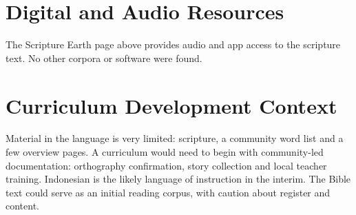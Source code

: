 \documentclass[12pt]{article}
\begin{document}
\section{Digital and Audio Resources}
The Scripture Earth page above provides audio and app access to the scripture text. No other corpora or software were found.

\section{Curriculum Development Context}
Material in the language is very limited: scripture, a community word list and a few overview pages. A curriculum would need to begin with community-led documentation: orthography confirmation, story collection and local teacher training. Indonesian is the likely language of instruction in the interim. The Bible text could serve as an initial reading corpus, with caution about register and content.
\end{document}
